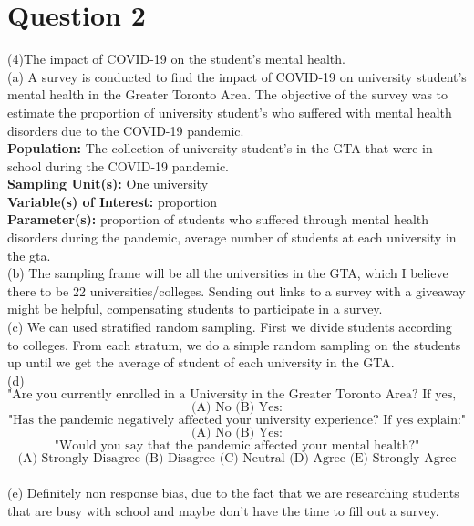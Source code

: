\documentclass[11pt]{article}
\theoremstyle{claim}
\begin{document}
\newpage
\section*{Question 2}
(4)The impact of COVID-19 on the student's mental health.
\vspace{5mm}
\\(a) A survey is conducted to find the impact of COVID-19 on university student's mental health in the Greater Toronto Area. The objective of the survey was to estimate the proportion of university student's who suffered with mental health disorders due to the COVID-19 pandemic.  
\vspace{2mm}
\\\textbf{Population:} The collection of university student's in the GTA that were in school during the COVID-19 pandemic.
\vspace{2mm}
\\\textbf{Sampling Unit(s):} One university
\vspace{2mm}
\\\textbf{Variable(s) of Interest:} proportion
\vspace{2mm}
\\\textbf{Parameter(s):} proportion of students who suffered through mental health disorders during the pandemic, average number of students at each university in the gta.
\vspace{5mm}
\\(b) The sampling frame will be all the universities in the GTA, which I believe there to be 22 universities/colleges. Sending out links to a survey with a giveaway might be helpful, compensating students to participate in a survey.
\vspace{5mm}
\\(c) We can used stratified random sampling. First we divide students according to colleges. From each stratum, we do a simple random sampling on the students up until we get the average of student of each university in the GTA.
\vspace{5mm}
\\(d)
\[\text{"Are you currently enrolled in a University in the Greater Toronto Area? If yes, where?:"}\]
\[\text{(A) No (B) Yes:}\]
\[\text{"Has the pandemic negatively affected your university experience? If yes explain:"}\]
\[\text{(A) No (B) Yes:}\]
\[\text{"Would you say that the pandemic affected your mental health?"}\]
\[\text{(A) Strongly Disagree (B) Disagree (C) Neutral (D) Agree (E) Strongly Agree}\]
\vspace{5mm}
\\(e) Definitely non response bias, due to the fact that we are researching students that are busy with school and maybe don't have the time to fill out a survey. 
\end{document}
